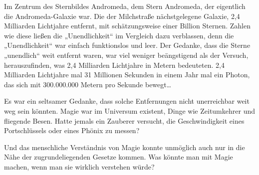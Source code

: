 Im Zentrum des Sternbildes Andromeda, dem Stern Andromeda, der eigentlich die Andromeda-Galaxie war. Die der Milchstraße nächstgelegene Galaxie, 2,4 Milliarden Lichtjahre entfernt, mit schätzungsweise einer Billion Sternen.
Zahlen wie diese ließen die „Unendlichkeit“ im Vergleich dazu verblassen, denn die „Unendlichkeit“ war einfach funktionslos und leer. Der Gedanke, dass die Sterne „unendlich“ weit entfernt waren, war viel weniger beängstigend als der Versuch, herauszufinden, was 2,4 Milliarden Lichtjahre in Metern bedeuteten. 2,4 Milliarden Lichtjahre mal 31 Millionen Sekunden in einem Jahr mal ein Photon, das sich mit 300.000.000 Metern pro Sekunde bewegt…

Es war ein seltsamer Gedanke, dass solche Entfernungen nicht unerreichbar weit weg sein könnten. Magie war im Universum existent, Dinge wie Zeitumkehrer und fliegende Besen. Hatte jemals ein Zauberer versucht, die Geschwindigkeit eines Portschlüssels oder eines Phönix zu messen?

Und das menschliche Verständnis von Magie konnte unmöglich auch nur in die Nähe der zugrundeliegenden Gesetze kommen. Was könnte man mit Magie machen, wenn man sie wirklich verstehen würde?

